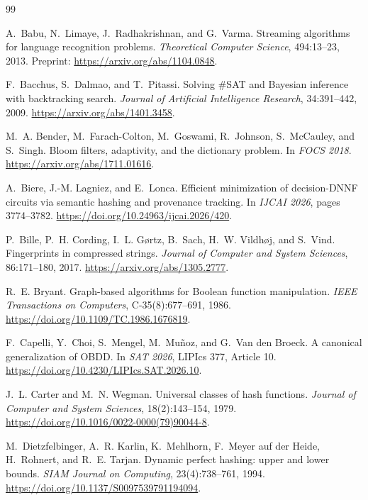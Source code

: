 \documentclass[11pt]{article}
\begin{document}
\begin{thebibliography}{99}

A.~Babu, N.~Limaye, J.~Radhakrishnan, and G.~Varma.
\newblock Streaming algorithms for language recognition problems.
\newblock \emph{Theoretical Computer Science}, 494:13--23, 2013.
\newblock Preprint: \url{https://arxiv.org/abs/1104.0848}.

F.~Bacchus, S.~Dalmao, and T.~Pitassi.
\newblock Solving \#SAT and Bayesian inference with backtracking search.
\newblock \emph{Journal of Artificial Intelligence Research}, 34:391--442,
2009.
\newblock \url{https://arxiv.org/abs/1401.3458}.

M.~A. Bender, M.~Farach-Colton, M.~Goswami, R.~Johnson, S.~McCauley, and
S.~Singh.
\newblock Bloom filters, adaptivity, and the dictionary problem.
\newblock In \emph{FOCS 2018}.
\newblock \url{https://arxiv.org/abs/1711.01616}.

A.~Biere, J.-M. Lagniez, and E.~Lonca.
\newblock Efficient minimization of decision-DNNF circuits via semantic
hashing and provenance tracking.
\newblock In \emph{IJCAI 2026}, pages 3774--3782.
\newblock \url{https://doi.org/10.24963/ijcai.2026/420}.

P.~Bille, P.~H. Cording, I.~L. G\o rtz, B.~Sach, H.~W. Vildh\o j, and
S.~Vind.
\newblock Fingerprints in compressed strings.
\newblock \emph{Journal of Computer and System Sciences}, 86:171--180, 2017.
\newblock \url{https://arxiv.org/abs/1305.2777}.

R.~E. Bryant.
\newblock Graph-based algorithms for Boolean function manipulation.
\newblock \emph{IEEE Transactions on Computers}, C-35(8):677--691, 1986.
\newblock \url{https://doi.org/10.1109/TC.1986.1676819}.

F.~Capelli, Y.~Choi, S.~Mengel, M.~Mu\~noz, and G.~Van den Broeck.
\newblock A canonical generalization of OBDD.
\newblock In \emph{SAT 2026}, LIPIcs 377, Article 10.
\newblock \url{https://doi.org/10.4230/LIPIcs.SAT.2026.10}.

J.~L. Carter and M.~N. Wegman.
\newblock Universal classes of hash functions.
\newblock \emph{Journal of Computer and System Sciences}, 18(2):143--154,
1979.
\newblock \url{https://doi.org/10.1016/0022-0000(79)90044-8}.

M.~Dietzfelbinger, A.~R. Karlin, K.~Mehlhorn, F.~Meyer auf der Heide,
H.~Rohnert, and R.~E. Tarjan.
\newblock Dynamic perfect hashing: upper and lower bounds.
\newblock \emph{SIAM Journal on Computing}, 23(4):738--761, 1994.
\newblock \url{https://doi.org/10.1137/S0097539791194094}.


\end{thebibliography}
\end{document}
